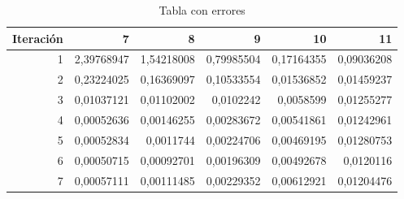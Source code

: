 \begin{table}[htbp]
  \centering
  \caption{Tabla con errores}
    \begin{tabular}{rrrrrr}
    \toprule
    Iteración & 7     & 8     & 9     & 10    & 11 \\
    \midrule
    1     & 2,39768947 & 1,54218008 & 0,79985504 & 0,17164355 & 0,09036208 \\
    2     & 0,23224025 & 0,16369097 & 0,10533554 & 0,01536852 & 0,01459237 \\
    3     & 0,01037121 & 0,01102002 & 0,0102242 & 0,0058599 & 0,01255277 \\
    4     & 0,00052636 & 0,00146255 & 0,00283672 & 0,00541861 & 0,01242961 \\
    5     & 0,00052834 & 0,0011744 & 0,00224706 & 0,00469195 & 0,01280753 \\
    6     & 0,00050715 & 0,00092701 & 0,00196309 & 0,00492678 & 0,0120116 \\
    7     & 0,00057111 & 0,00111485 & 0,00229352 & 0,00612921 & 0,01204476 \\
    \bottomrule
    \end{tabular}%
  \label{tab:erroresTable}%
\end{table}%

